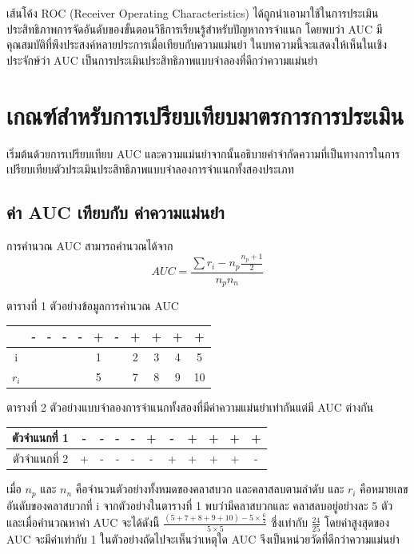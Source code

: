 \documentclass[twoside, twocolumn, 12pt]{article}
\begin{document}
เส้นโค้ง ROC (Receiver Operating Characteristics) ได้ถูกนำเอามาใช้ในการประเมินประสิทธิภาพการจัดอันดับของขั้นตอนวิธีการเรียนรู้สำหรับปัญหาการจำแนก \cite{2,3} โดยพบว่า AUC มีคุณสมบัติที่พึงประสงค์หลายประการเมื่อเทียบกับความแม่นยำ 
ในบทความนี้จะแสดงให้เห็นในเชิงประจักษ์ว่า AUC เป็นการประเมินประสิทธิภาพแบบจำลองที่ดีกว่าความแม่นยำ

\section{เกณฑ์สำหรับการเปรียบเทียบมาตรการการประเมิน}
\quad เริ่มต้นด้วยการเปรียบเทียบ AUC และความแม่นยำจากนั้นอธิบายคำจำกัดความที่เป็นทางการในการเปรียบเทียบตัวประเมินประสิทธิภาพแบบจำลองการจำแนกทั้งสองประเภท
\subsection{ค่า AUC เทียบกับ ค่าความแม่นยำ}
\quad การคำนวณ AUC สามารถคำนวณได้จาก\cite{1}
\begin{equation}
AUC = \frac{\sum r_i-n_p\frac{n_p + 1}{2}}{n_pn_n}
\end{equation}
\begin{center} ตารางที่ 1 ตัวอย่างข้อมูลการคำนวณ AUC \end{center}
\begin{center}
\begin{tabular}{ccccccccccc}
  &-&-&-&-&+&-&+&+&+&+ \\
  \hline
  i&&&&&1&&2&3&4&5 \\
  $r_i$& & & & & 5&&7&8&9&10\\
  \hline  
\end{tabular}
\end{center}
\begin{center} ตารางที่ 2 ตัวอย่างแบบจำลองการจำแนกทั้งสองที่มีค่าความแม่นยำเท่ากันแต่มี AUC ต่างกัน \end{center}
\begin{center}
\begin{tabular}{c|ccccc|ccccc}
  \hline
  ตัวจำแนกที่ 1 &-& -& -& -& +& -& +& +& +& +\\
  \hline
  ตัวจำแนกที่ 2 & +& -& -& -& -& +& +& +& +& -\\
  \hline  
\end{tabular}
\end{center}

เมื่อ $n_p$ และ $n_n$ คือจำนวนตัวอย่างทั้งหมดของคลาสบวก และคลาสลบตามลำดับ และ $r_i$ คือหมายเลขอันดับของคลาสบวกที่ i จากตัวอย่างในตารางที่ 1 พบว่ามีคลาสบวกและ คลาสลบอยู่อย่างละ 5 ตัว และเมื่อคำนวณหาค่า AUC จะได้ดังนี้ $\frac{(5+7+8+9+10)- 5\times\frac{6}{2}}{5\times5}$ ซึ่งเท่ากับ $\frac{24}{25}$ โดยค่าสูงสุดของ AUC จะมีค่าเท่ากับ 1 ในตัวอย่างถัดไปจะเห็นว่าเหตุใด AUC จึงเป็นหน่วยวัดที่ดีกว่าความแม่นยำ
\end{document}
